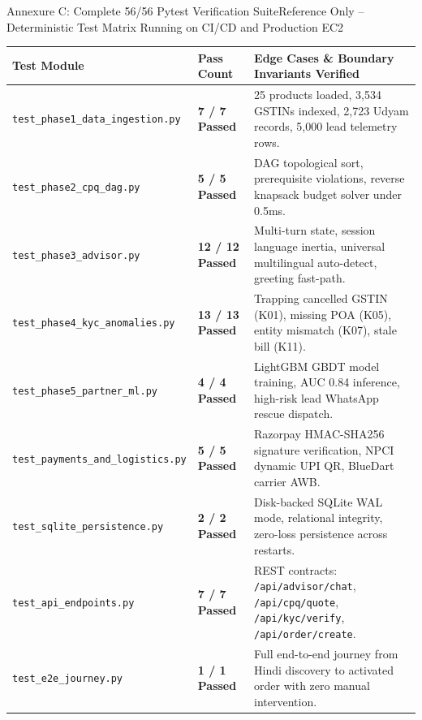 \documentclass[aspectratio=169,10pt]{beamer}
\begin{document}
\begin{frame}{Annexure C: Complete 56/56 Pytest Verification Suite}{Reference Only -- Deterministic Test Matrix Running on CI/CD and Production EC2}
  \begin{tcolorbox}[academicbox]
    \centering
    {\fontsize{4.6pt}{5.8pt}\selectfont
    \begin{tabularx}{\linewidth}{p{3.0cm}p{1.4cm}X}
      \toprule
      \textbf{Test Module} & \textbf{Pass Count} & \textbf{Edge Cases \& Boundary Invariants Verified} \\
      \midrule
      \texttt{test\_phase1\_data\_ingestion.py} & \textbf{7 / 7 Passed} & 25 products loaded, 3,534 GSTINs indexed, 2,723 Udyam records, 5,000 lead telemetry rows. \\
      \texttt{test\_phase2\_cpq\_dag.py} & \textbf{5 / 5 Passed} & DAG topological sort, prerequisite violations, reverse knapsack budget solver under 0.5ms. \\
      \texttt{test\_phase3\_advisor.py} & \textbf{12 / 12 Passed} & Multi-turn state, session language inertia, universal multilingual auto-detect, greeting fast-path. \\
      \texttt{test\_phase4\_kyc\_anomalies.py} & \textbf{13 / 13 Passed} & Trapping cancelled GSTIN (K01), missing POA (K05), entity mismatch (K07), stale bill (K11). \\
      \texttt{test\_phase5\_partner\_ml.py} & \textbf{4 / 4 Passed} & LightGBM GBDT model training, AUC 0.84 inference, high-risk lead WhatsApp rescue dispatch. \\
      \texttt{test\_payments\_and\_logistics.py} & \textbf{5 / 5 Passed} & Razorpay HMAC-SHA256 signature verification, NPCI dynamic UPI QR, BlueDart carrier AWB. \\
      \texttt{test\_sqlite\_persistence.py} & \textbf{2 / 2 Passed} & Disk-backed SQLite WAL mode, relational integrity, zero-loss persistence across restarts. \\
      \texttt{test\_api\_endpoints.py} & \textbf{7 / 7 Passed} & REST contracts: \texttt{/api/advisor/chat}, \texttt{/api/cpq/quote}, \texttt{/api/kyc/verify}, \texttt{/api/order/create}. \\
      \texttt{test\_e2e\_journey.py} & \textbf{1 / 1 Passed} & Full end-to-end journey from Hindi discovery to activated order with zero manual intervention. \\

\end{tabularx}}
\end{tcolorbox}
\end{frame}
\end{document}

